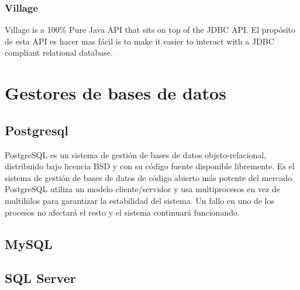 \documentclass[12pt, oneside]{article}
\begin{document}
\subsubsection{Village}
Village is a 100\% Pure Java API that sits on top of the JDBC API. El propósito de esta API es hacer mas fácil is to make it easier to interact with a JDBC compliant relational database.

\section{Gestores de bases de datos}

\subsection{Postgresql}
PostgreSQL es un sistema de gestión de bases de datos objeto-relacional, distribuido bajo licencia BSD y con su código fuente disponible libremente. Es el sistema de gestión de bases de datos de código abierto más potente del mercado.
PostgreSQL utiliza un modelo cliente/servidor y usa multiprocesos en vez de multihilos para garantizar la estabilidad del sistema. Un fallo en uno de los procesos no afectará el resto y el sistema continuará funcionando.

\subsection{MySQL}

\subsection{SQL Server}

%
\end{document}
